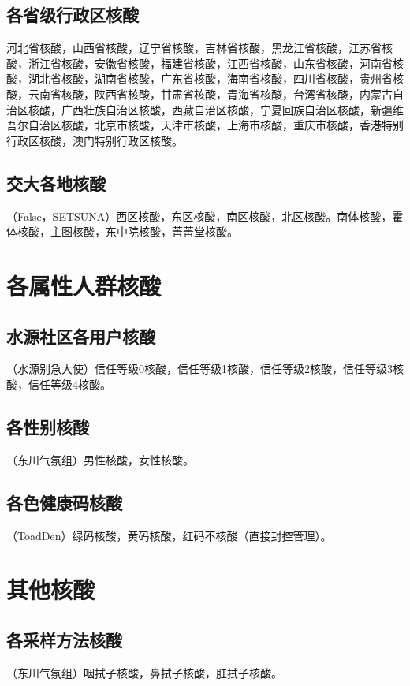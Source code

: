 \documentclass{ctexbook}
\begin{document}
\section{各省级行政区核酸}
河北省核酸，山西省核酸，辽宁省核酸，吉林省核酸，黑龙江省核酸，江苏省核酸，浙江省核酸，安徽省核酸，福建省核酸，江西省核酸，山东省核酸，河南省核酸，湖北省核酸，湖南省核酸，广东省核酸，海南省核酸，四川省核酸，贵州省核酸，云南省核酸，陕西省核酸，甘肃省核酸，青海省核酸，台湾省核酸，内蒙古自治区核酸，广西壮族自治区核酸，西藏自治区核酸，宁夏回族自治区核酸，新疆维吾尔自治区核酸，北京市核酸，天津市核酸，上海市核酸，重庆市核酸，香港特别行政区核酸，澳门特别行政区核酸。

\section{交大各地核酸}
（False，SETSUNA）西区核酸，东区核酸，南区核酸，北区核酸。南体核酸，霍体核酸，主图核酸，东中院核酸，菁菁堂核酸。

\chapter{各属性人群核酸}

\section{水源社区各用户核酸}
（水源别急大使）信任等级0核酸，信任等级1核酸，信任等级2核酸，信任等级3核酸，信任等级4核酸。

\section{各性别核酸}
（东川气氛组）男性核酸，女性核酸。

\section{各色健康码核酸}
（ToadDen）绿码核酸，黄码核酸，红码不核酸（直接封控管理）。

\chapter{其他核酸}

\section{各采样方法核酸}
（东川气氛组）咽拭子核酸，鼻拭子核酸，肛拭子核酸。
\end{document}

